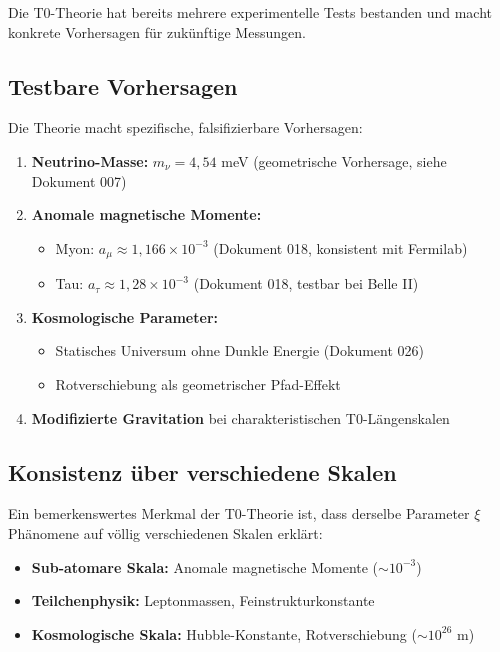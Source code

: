 \documentclass[12pt,a4paper]{article}
\begin{document}
	Die T0-Theorie hat bereits mehrere experimentelle Tests bestanden und macht konkrete Vorhersagen für zukünftige Messungen.
	
	\subsection{Testbare Vorhersagen}
	
	\begin{keyresult}
		Die Theorie macht spezifische, falsifizierbare Vorhersagen:
		\begin{enumerate}
			\item \textbf{Neutrino-Masse:} $m_\nu = 4{,}54$ meV (geometrische Vorhersage, siehe Dokument 007)
			
			\item \textbf{Anomale magnetische Momente:}
			\begin{itemize}
				\item Myon: $a_\mu \approx 1{,}166 \times 10^{-3}$ (Dokument 018, konsistent mit Fermilab)
				\item Tau: $a_\tau \approx 1{,}28 \times 10^{-3}$ (Dokument 018, testbar bei Belle II)
			\end{itemize}
			
			\item \textbf{Kosmologische Parameter:}
			\begin{itemize}
				\item Statisches Universum ohne Dunkle Energie (Dokument 026)
				\item Rotverschiebung als geometrischer Pfad-Effekt
			\end{itemize}
			
			\item \textbf{Modifizierte Gravitation} bei charakteristischen T0-Längenskalen
		\end{enumerate}
	\end{keyresult}
	
	\subsection{Konsistenz über verschiedene Skalen}
	
	Ein bemerkenswertes Merkmal der T0-Theorie ist, dass derselbe Parameter $\xi$ Phänomene auf völlig verschiedenen Skalen erklärt:
	
	\begin{itemize}
		\item \textbf{Sub-atomare Skala:} Anomale magnetische Momente ($\sim 10^{-3}$)
		\item \textbf{Teilchenphysik:} Leptonmassen, Feinstrukturkonstante
		\item \textbf{Kosmologische Skala:} Hubble-Konstante, Rotverschiebung ($\sim 10^{26}$ m)
	\end{itemize}
	
\end{document}
